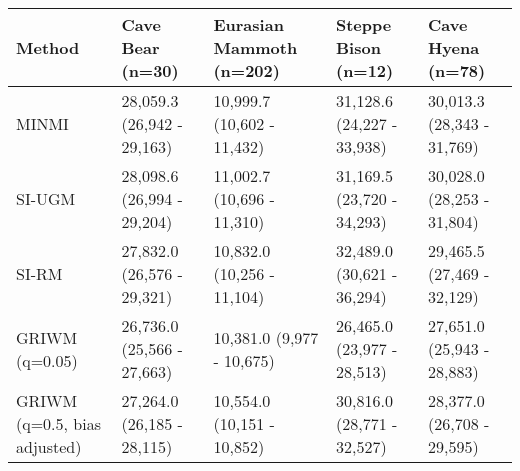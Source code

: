 
\begin{tabular}{lllll}
\toprule
Method & Cave Bear (n=30) & Eurasian Mammoth (n=202) & Steppe Bison (n=12) & Cave Hyena (n=78)\\
\midrule
MINMI & 28,059.3 (26,942 - 29,163) & 10,999.7 (10,602 - 11,432) & 31,128.6 (24,227 - 33,938) & 30,013.3 (28,343 - 31,769)\\
SI-UGM & 28,098.6 (26,994 - 29,204) & 11,002.7 (10,696 - 11,310) & 31,169.5 (23,720 - 34,293) & 30,028.0 (28,253 - 31,804)\\
SI-RM & 27,832.0 (26,576 - 29,321) & 10,832.0 (10,256 - 11,104) & 32,489.0 (30,621 - 36,294) & 29,465.5 (27,469 - 32,129)\\
GRIWM (q=0.05) & 26,736.0 (25,566 - 27,663) & 10,381.0 (9,977 - 10,675) & 26,465.0 (23,977 - 28,513) & 27,651.0 (25,943 - 28,883)\\
GRIWM (q=0.5, bias adjusted) & 27,264.0 (26,185 - 28,115) & 10,554.0 (10,151 - 10,852) & 30,816.0 (28,771 - 32,527) & 28,377.0 (26,708 - 29,595)\\
\bottomrule
\end{tabular}

